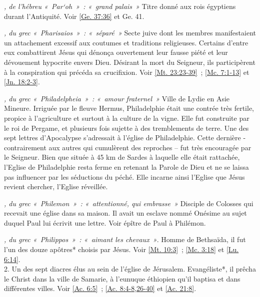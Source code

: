 \begin{multicols}{2}
\textit{, de l'hébreu «~Par`oh~»~: «~grand palais~»}\newline
Titre donné aux rois égyptiens durant l'Antiquité.\newline
Voir \vref{Ge. 37:36} et Ge. 41.

\textit{, du grec «~Pharisaios~»~: «~séparé~»}\newline
Secte juive dont les membres manifestaient un attachement excessif aux coutumes et traditions religieuses. Certains d'entre eux combattirent Jésus qui dénonça ouvertement leur fausse piété et leur dévouement hypocrite envers Dieu. Désirant la mort du Seigneur, ils participèrent à la conspiration qui précéda sa crucifixion.\newline
Voir \vref{Mt. 23:23-39}~; \vref{Mc. 7:1-13} et \vref{Jn. 18:2-3}.

\textit{, du grec «~Philadelpheia~»~: «~amour fraternel~»}\newline
Ville de Lydie en Asie Mineure. Irriguée par le fleuve Hermus, Philadelphie était une contrée très fertile, propice à l'agriculture et surtout à la culture de la vigne. Elle fut construite par le roi de Pergame, et plusieurs fois sujette à des tremblements de terre. Une des sept lettres d'Apocalypse s'adressait à l'église de Philadelphie. Cette dernière - contrairement aux autres qui cumulèrent des reproches – fut très encouragée par le Seigneur. Bien que située à 45 km de Sardes à laquelle elle était rattachée, l'Eglise de Philadelphie resta ferme en retenant la Parole de Dieu et ne se laissa pas influencer par les séductions du péché. Elle incarne ainsi l'Eglise que Jésus revient chercher, l'Eglise réveillée.

\textit{, du grec «~Philemon~»~: «~attentionné, qui embrasse~»}\newline
Disciple de Colosses qui recevait une église dans sa maison. Il avait un esclave nommé Onésime au sujet duquel Paul lui écrivit une lettre. Voir épître de Paul à Philémon.

\textit{, du grec «~Philippos~»~: «~aimant les chevaux~»}. Homme de Bethsaïda, il fut l'un des douze apôtres* choisis par Jésus.\newline
Voir \vref{Mt. 10:3}~; \vref{Mc. 3:18} et \vref{Lu. 6:14}.
\\2. Un des sept diacres élus au sein de l'église de Jérusalem. Evangéliste*, il prêcha le Christ dans la ville de Samarie, à l'eunuque éthiopien qu'il baptisa et dans différentes villes.\newline
Voir \vref{Ac. 6:5}~; \vref{Ac. 8:4-8,26-40} et \vref{Ac. 21:8}.


\end{multicols}
